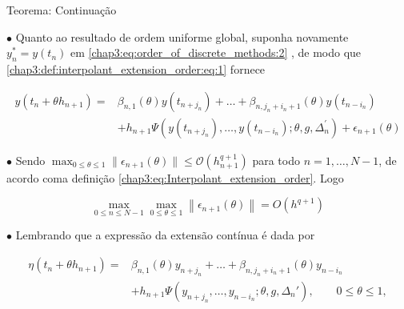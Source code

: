 \documentclass{beamer}
\theoremstyle{plain}
\theoremstyle{definition}
\begin{document}
\begin{frame}{Teorema: Continuação}

    \footnotesize

    \phantom{aa} $\bullet$ Quanto ao resultado de ordem uniforme global, suponha novamente \(y_{n}^{*}=y\left(t_{n}\right)\) em \eqref{chap3:eq:order_of_discrete_methods:2} , de modo que \eqref{chap3:def:interpolant_extension_order:eq:1} fornece 



    \begin{equation}
      \begin{aligned}
        y(t_{n}+\theta h_{n+1})= & \beta_{n, 1}(\theta) y(t_{n+j_{n}})+\ldots+\beta_{n, j_{n}+i_{n}+1}(\theta) y(t_{n-i_{n}}) \\
        & +h_{n+1} \Psi(y(t_{n+j_{n}}), \ldots, y(t_{n-i_{n}}) ; \theta, g, \Delta_{n}^{\prime})+\epsilon_{n+1}(\theta) 
      \end{aligned}
      \label{chap3:teo:ODE_methods_convergence:eq:7}
    \end{equation}

    \noindent
    \phantom{aa} $\bullet$ Sendo $\max _{0 \leq \theta \leq 1}\|\epsilon_{n+1}(\theta)\| \leq \mathcal{O}(h_{n+1}^{q+1})$ para todo $n = 1, \dots, N-1$, de acordo coma definição \eqref{chap3:eq:Interpolant_extension_order}. Logo

    \begin{equation}
      \max _{0 \leq n \leq N-1} \max _{0 \leq \theta \leq 1}\left\|\epsilon_{n+1}(\theta)\right\|=O\left(h^{q+1}\right)
      \label{chap3:teo:ODE_methods_convergence:eq:8}
    \end{equation}

    \phantom{aa} $\bullet$ Lembrando que a expressão da extensão contínua é dada por 

    \vspace{-0.3cm}
    \begin{equation}
        \begin{split}
            \eta(t_n + \theta h_{n+1}) = &\beta_{n, 1} (\theta) y_{n + j_n} + \dots + \beta_{n, j_n + i_n + 1}(\theta) y_{n - i_n} \\
                                         &+ h_{n+1} \Psi(y_{n+j_n}, \dots, y_{n-i_n}; \theta, g, \Delta _n '), \qquad 0 \leq \theta \leq 1,
        \end{split}
    \end{equation}


\end{frame}
\end{document}
